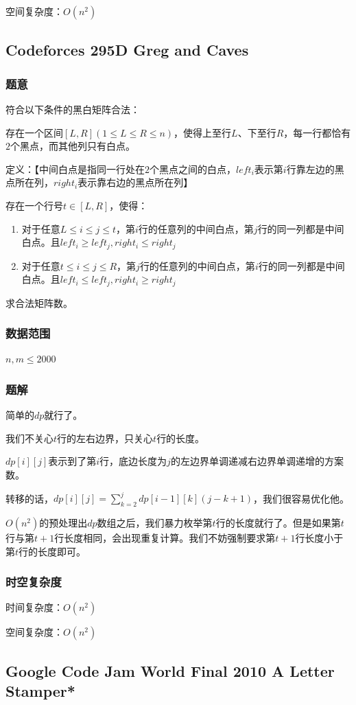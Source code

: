 \documentclass{ctexart}
\begin{document}
空间复杂度：$O(n^2)$
\subsection{Codeforces 295D Greg and Caves}
\subsubsection{题意}
符合以下条件的黑白矩阵合法：

存在一个区间$[L,R](1 \le L \le R \le n)$，使得上至行$L$、下至行$R$，每一行都恰有$2$个黑点，而其他列只有白点。

定义：【中间白点是指同一行处在$2$个黑点之间的白点，$left_i$表示第$i$行靠左边的黑点所在列，$right_i$表示靠右边的黑点所在列】

存在一个行号$t \in [L,R]$，使得：
\begin{enumerate}
\item 对于任意$L \le i \le j \le t$，第$i$行的任意列的中间白点，第$j$行的同一列都是中间白点。且$left_i \ge left_j,right_i \le right_j$
\item 对于任意$t \le i \le j \le R$，第$j$行的任意列的中间白点，第$i$行的同一列都是中间白点。且$left_i \le left_j,right_i \ge right_j$
\end{enumerate}

求合法矩阵数。
\subsubsection{数据范围}
$n,m \le 2000$
\subsubsection{题解}
简单的$dp$就行了。

我们不关心$t$行的左右边界，只关心$t$行的长度。

$dp[i][j]$表示到了第$i$行，底边长度为$j$的左边界单调递减右边界单调递增的方案数。

转移的话，$dp[i][j]=\sum\limits_{k=2}^j dp[i-1][k](j-k+1)$，我们很容易优化他。

$O(n^2)$的预处理出$dp$数组之后，我们暴力枚举第$t$行的长度就行了。但是如果第$t$行与第$t+1$行长度相同，会出现重复计算。我们不妨强制要求第$t+1$行长度小于第$t$行的长度即可。
\subsubsection{时空复杂度}
时间复杂度：$O(n^2)$

空间复杂度：$O(n^2)$
\subsection{Google Code Jam World Final 2010 A Letter Stamper*}
\end{document}
